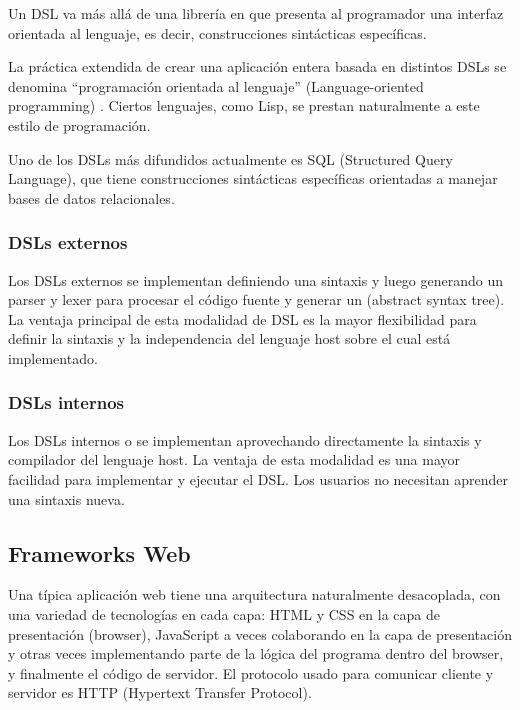 \documentclass[12pt]{article}
\begin{document}
Un DSL va más allá de una librería en que presenta al programador una interfaz orientada al lenguaje, es decir, construcciones sintácticas específicas.

La práctica extendida de crear una aplicación entera basada en distintos DSLs se denomina “programación orientada al lenguaje” (Language-oriented programming) \cite{Ward95languageoriented} \cite{dmitriev2005language}. Ciertos lenguajes, como Lisp, se prestan naturalmente a este estilo de programación.

Uno de los DSLs más difundidos actualmente es SQL (Structured Query Language), que tiene construcciones sintácticas específicas orientadas a manejar bases de datos relacionales.

\subsubsection{DSLs externos}

Los DSLs externos se implementan definiendo una sintaxis y luego generando un parser y lexer para procesar el código fuente y generar un  (abstract syntax tree). La ventaja principal de esta modalidad de DSL es la mayor flexibilidad para definir la sintaxis y la independencia del lenguaje host sobre el cual está implementado.

\subsubsection{DSLs internos}

Los DSLs internos o  se implementan aprovechando directamente la sintaxis y compilador del lenguaje host. La ventaja de esta modalidad es una mayor facilidad para implementar y ejecutar el DSL. Los usuarios no necesitan aprender una sintaxis nueva.

\subsection{Frameworks Web}

Una típica aplicación web tiene una arquitectura naturalmente desacoplada, con una variedad de tecnologías en cada capa: HTML y CSS en la capa de presentación (browser), JavaScript a veces colaborando en la capa de presentación y otras veces implementando parte de la lógica del programa dentro del browser, y finalmente el código de servidor. El protocolo usado para comunicar cliente y servidor es HTTP (Hypertext Transfer Protocol).
\end{document}
